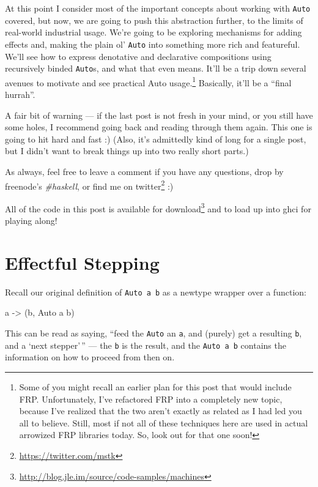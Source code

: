\documentclass[]{article}
\newenvironment{Shaded}{}{}
\newcommand{\DataTypeTok}[1]{\textcolor[rgb]{0.56,0.13,0.00}{#1}}
\newcommand{\NormalTok}[1]{#1}
\newcommand{\OtherTok}[1]{\textcolor[rgb]{0.00,0.44,0.13}{#1}}
\renewcommand{\href}[2]{#2\footnote{\url{#1}}}
\begin{document}
At this point I consider most of the important concepts about working with
\texttt{Auto} covered, but now, we are going to push this abstraction further,
to the limits of real-world industrial usage. We're going to be exploring
mechanisms for adding effects and, making the plain ol' \texttt{Auto} into
something more rich and featureful. We'll see how to express denotative and
declarative compositions using recursively binded \texttt{Auto}s, and what that
even means. It'll be a trip down several avenues to motivate and see practical
Auto usage.\footnote{Some of you might recall an earlier plan for this post that
  would include FRP. Unfortunately, I've refactored FRP into a completely new
  topic, because I've realized that the two aren't exactly as related as I had
  led you all to believe. Still, most if not all of these techniques here are
  used in actual arrowized FRP libraries today. So, look out for that one soon!}
Basically, it'll be a ``final hurrah''.

A fair bit of warning --- if the last post is not fresh in your mind, or you
still have some holes, I recommend going back and reading through them again.
This one is going to hit hard and fast :) (Also, it's admittedly kind of long
for a single post, but I didn't want to break things up into two really short
parts.)

As always, feel free to leave a comment if you have any questions, drop by
freenode's \emph{\#haskell}, or find me on
\href{https://twitter.com/mstk}{twitter} :)

All of the code in this post is
\href{http://blog.jle.im/source/code-samples/machines}{available for download}
and to load up into ghci for playing along!

\section{Effectful Stepping}\label{effectful-stepping}

Recall our original definition of \texttt{Auto\ a\ b} as a newtype wrapper over
a function:

\begin{Shaded}
\begin{Highlighting}[]
\NormalTok{a }\OtherTok{{-}\textgreater{}}\NormalTok{ (b, }\DataTypeTok{Auto}\NormalTok{ a b)}
\end{Highlighting}
\end{Shaded}

This can be read as saying, ``feed the \texttt{Auto} an \texttt{a}, and (purely)
get a resulting \texttt{b}, and a `next stepper'\,'' --- the \texttt{b} is the
result, and the \texttt{Auto\ a\ b} contains the information on how to proceed
from then on.
\end{document}
